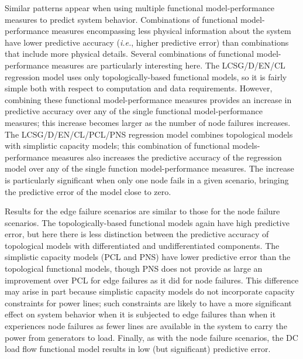 Similar patterns appear when using multiple functional model-performance measures to predict system behavior.  Combinations of functional model-performance measures encompassing less physical information about the system have lower predictive accuracy (\emph{i.e.}, higher predictive error) than combinations that include more physical details. Several combinations of functional model-performance measures are particularly interesting here.  The LCSG/D/EN/CL regression model uses only topologically-based functional models, so it is fairly simple both with respect to computation and data requirements. However, combining these functional model-performance measures provides an increase in predictive accuracy over any of the single functional model-performance measures; this increase becomes larger as the number of node failures increases.  The LCSG/D/EN/CL/PCL/PNS regression model combines topological models with simplistic capacity models; this combination of functional models-performance measures also increases the predictive accuracy of the regression model over any of the single function model-performance measures.  The increase is particularly significant when only one node fails in a given scenario, bringing the predictive error of the model close to zero.

Results for the edge failure scenarios are similar to those for the node failure scenarios.  The topologically-based functional models again have high predictive error, but here there is less distinction between the predictive accuracy of topological models with differentiated and undifferentiated components.  The simplistic capacity models (PCL and PNS) have lower predictive error than the topological functional models, though PNS does not provide as large an improvement over PCL for edge failures as it did for node failures.  This difference may arise in part because simplistic capacity models do not incorporate capacity constraints for power lines; such constraints are likely to have a more significant effect on system behavior when it is subjected to edge failures than when it experiences node failures as fewer lines are available in the system to carry the power from generators to load.  Finally, as with the node failure scenarios, the DC load flow functional model results in low (but significant) predictive error.

